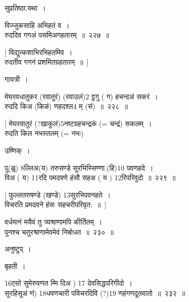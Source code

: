 \documentclass[11pt, openany]{book}
\begin{document}

\newpage

\begin{quote}

\end{quote}
सुप्रतिष्ठा.यथा~।

{\na विज्जुकसाहि अभिहतं व~। \\
रुददिव गगअं पसमिअगहतारम्~॥~२२७~॥

[ विद्युत्कशाभिरभिहतमिव~। \\
रुदतीव गगनं प्रशमितग्रहतारम्~॥~] }

गायत्री~।

{\na मेघरवधातुकर (रवातुरं) (रवाउलं)2 ट्ठगु ( ग) हचन्दअं सकरं~।\\
रुददि किअ (किळं) णहदश्ल4 म् (सं)~॥~२२८~॥

[ मेघरवातुरं (?खाकुलं)5नष्टग्रहचन्द्रकं (= चन्द्रं) सकलम्~।\\
रुदति किल नभस्तलम् (= नभः) }

उष्णिक्~। 

{\na पु(ळु) 8ल्लिअ(य) तरुसण्डे सुरभिस्सिण्णा.(हि)10 पवणहदे~।\\
विअ ( य) 11रदि पमदवणे हंसौ सहअ ( य ) 12रिपरिवुदो~॥~२२९~॥

[ फुल्लतरुषण्डे (खण्डे) 13सुरभिपवनहते~।\\
विचरति प्रमदवने हंसः सहचरीपरिवृत:~॥~]

वर्धमानं मयैवं तु त्र्यश्राणामपि कीर्तितम्~।\\
पुनश्च चतुरश्राणामेवमेवं निबोधत~॥~२३०~॥}

अनुष्टुप्~। 

{\na [ताराबन्धवसणाहो विक्खिरमाणो मेहपडम्~।\\
किरणसहस्सविहूसिदी दो)14 उदयदि एसो रअणिअ )15रो~॥~२३१~॥

[ ताराबन्धवसनीधो विकिरन्स्सि मेघपटम्~।\\
किरणसहस्रविभूषित .उदयत्येष .रजनिकरः~॥~] }

बृहती~। 

{\na 16एसो सुमेरुवणत म्मि दिअ ) 17 देवसिद्धपरिगीदो~।\\
सुरहिसुअं णं) 18धवणचारी पविचरदिवि (?)19 णहंगणदूतवातो~॥~२३२~॥}


\newpage

\begin{quote}

\end{quote}
{ }
\end{document}
